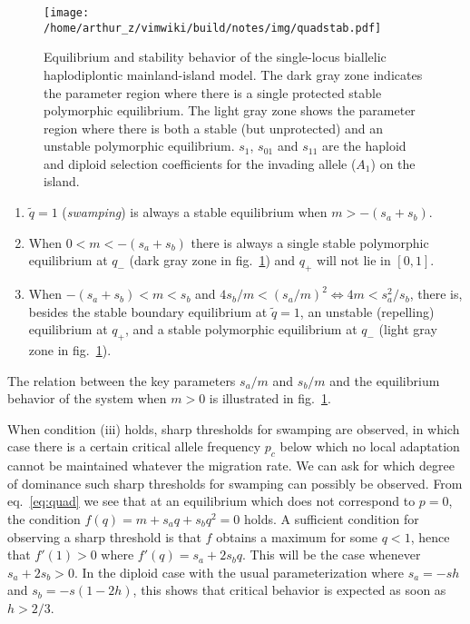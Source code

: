 \documentclass[
  11pt,
]{article}
\providecommand{\tightlist}{%
  \setlength{\itemsep}{0pt}\setlength{\parskip}{0pt}}
\begin{document}
\begin{figure}
\centering
\texttt{[image: /home/arthur\_z/vimwiki/build/notes/img/quadstab.pdf]}
\caption{Equilibrium and stability behavior of the single-locus
biallelic haplodiplontic mainland-island model. The dark gray zone
indicates the parameter region where there is a single protected stable
polymorphic equilibrium. The light gray zone shows the parameter region
where there is both a stable (but unprotected) and an unstable
polymorphic equilibrium. \(s_1\), \(s_{01}\) and \(s_{11}\) are the
haploid and diploid selection coefficients for the invading allele
(\(A_1\)) on the island. \label{fig:stab}}
\end{figure}

\begin{enumerate}
\def\labelenumi{\roman{enumi}.}
\tightlist
\item
  \(\tilde{q}=1\) (\emph{swamping}) is always a stable equilibrium when
  \(m > -(s_a + s_b)\).
\item
  When \(0 < m < -(s_a + s_b)\) there is always a single stable
  polymorphic equilibrium at \(q_-\) (dark gray zone in
  fig.~\ref{fig:stab}) and \(q_+\) will not lie in \([0,1]\).
\item
  When \(-(s_a + s_b) < m < s_b\) and
  \(4s_b/m < (s_a/m)^2 \iff 4m < s_a^2/s_b\), there is, besides the
  stable boundary equilibrium at \(\tilde{q}=1\), an unstable
  (repelling) equilibrium at \(q_+\), and a stable polymorphic
  equilibrium at \(q_-\) (light gray zone in fig.~\ref{fig:stab}).
\end{enumerate}

The relation between the key parameters \(s_a/m\) and \(s_b/m\) and the
equilibrium behavior of the system when \(m>0\) is illustrated in
fig.~\ref{fig:stab}.

When condition (iii) holds, sharp thresholds for swamping are observed,
in which case there is a certain critical allele frequency \(p_c\) below
which no local adaptation cannot be maintained whatever the migration
rate. We can ask for which degree of dominance such sharp thresholds for
swamping can possibly be observed. From eq.~\ref{eq:quad} we see that at
an equilibrium which does not correspond to \(p=0\), the condition
\(f(q) = m + s_a q + s_bq^2 = 0\) holds. A sufficient condition for
observing a sharp threshold is that \(f\) obtains a maximum for some
\(q < 1\), hence that \(f'(1) > 0\) where \(f'(q) = s_a + 2s_bq\). This
will be the case whenever \(s_a + 2s_b > 0\). In the diploid case with
the usual parameterization where \(s_a = -sh\) and \(s_b = -s(1-2h)\),
this shows that critical behavior is expected as soon as \(h > 2/3\).
\end{document}
